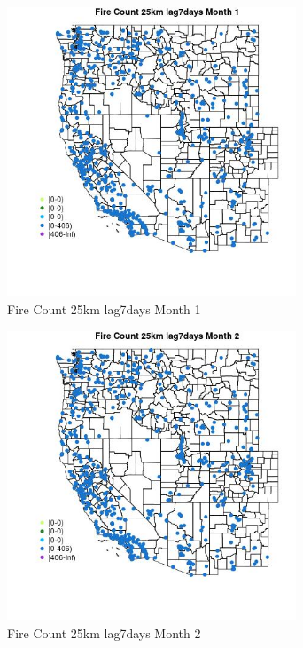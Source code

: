 \begin{figure} 
\centering  
\includegraphics[width=0.77\textwidth]{Code_Outputs/Report_ML_input_PM25_Step4_part_f_de_duplicated_aves_prioritize_24hr_obswNAs_MapObsMo1Fire_Count_25km_lag7days.jpg} 
\caption{\label{fig:Report_ML_input_PM25_Step4_part_f_de_duplicated_aves_prioritize_24hr_obswNAsMapObsMo1Fire_Count_25km_lag7days}Fire Count 25km lag7days Month 1} 
\end{figure} 
 

\clearpage 

\begin{figure} 
\centering  
\includegraphics[width=0.77\textwidth]{Code_Outputs/Report_ML_input_PM25_Step4_part_f_de_duplicated_aves_prioritize_24hr_obswNAs_MapObsMo2Fire_Count_25km_lag7days.jpg} 
\caption{\label{fig:Report_ML_input_PM25_Step4_part_f_de_duplicated_aves_prioritize_24hr_obswNAsMapObsMo2Fire_Count_25km_lag7days}Fire Count 25km lag7days Month 2} 
\end{figure} 
 

